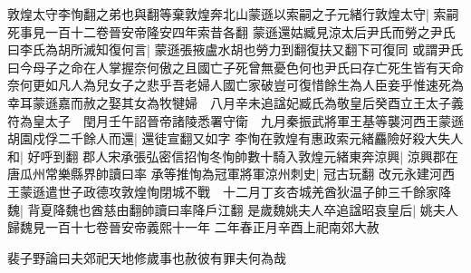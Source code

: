 敦煌太守李恂翻之弟也與翻等棄敦煌奔北山蒙遜以索嗣之子元緒行敦煌太守|{
	索嗣死事見一百十二卷晉安帝隆安四年索昔各翻}
蒙遜還姑臧見涼太后尹氏而勞之尹氏曰李氏為胡所滅知復何言|{
	蒙遜張掖盧水胡也勞力到翻復扶又翻下可復同}
或謂尹氏曰今母子之命在人掌握奈何傲之且國亡子死曾無憂色何也尹氏曰存亡死生皆有天命奈何更如凡人為兒女子之悲乎吾老婦人國亡家破豈可復惜餘生為人臣妾乎惟速死為幸耳蒙遜嘉而赦之娶其女為牧犍婦　八月辛未追諡妃臧氏為敬皇后癸酉立王太子義符為皇太子　閏月壬午詔晉帝諸陵悉署守衛　九月秦振武將軍王基等襲河西王蒙遜胡園戍俘二千餘人而還|{
	還徒宣翻又如字}
李恂在敦煌有惠政索元緒麤險好殺大失人和|{
	好呼到翻}
郡人宋承張弘密信招恂冬恂帥數十騎入敦煌元緒東奔涼興|{
	涼興郡在唐瓜州常樂縣界帥讀曰率}
承等推恂為冠軍將軍涼州刺史|{
	冠古玩翻}
改元永建河西王蒙遜遣世子政德攻敦煌恂閉城不戰　十二月丁亥杏城羌酋狄温子帥三千餘家降魏|{
	背夏降魏也酋慈由翻帥讀曰率降戶江翻}
是歲魏姚夫人卒追諡昭哀皇后|{
	姚夫人歸魏見一百十七卷晉安帝義熙十一年}
二年春正月辛酉上祀南郊大赦

裴子野論曰夫郊祀天地修歲事也赦彼有罪夫何為哉

